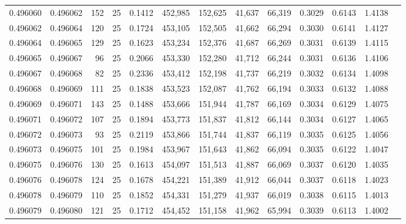 \begin{tabular}{rrrrrrrrrrrrr}
0.496060 & 0.496062 &   152 &  25 &                                     0.1412 & 452,985 & 152,625 &  41,637 &  66,319 & 0.3029 & 0.6143 & 1.4138 \\
0.496062 & 0.496064 &   120 &  25 &                                     0.1724 & 453,105 & 152,505 &  41,662 &  66,294 & 0.3030 & 0.6141 & 1.4127 \\
0.496064 & 0.496065 &   129 &  25 &                                     0.1623 & 453,234 & 152,376 &  41,687 &  66,269 & 0.3031 & 0.6139 & 1.4115 \\
0.496065 & 0.496067 &    96 &  25 &                                     0.2066 & 453,330 & 152,280 &  41,712 &  66,244 & 0.3031 & 0.6136 & 1.4106 \\
0.496067 & 0.496068 &    82 &  25 &                                     0.2336 & 453,412 & 152,198 &  41,737 &  66,219 & 0.3032 & 0.6134 & 1.4098 \\
0.496068 & 0.496069 &   111 &  25 &                                     0.1838 & 453,523 & 152,087 &  41,762 &  66,194 & 0.3033 & 0.6132 & 1.4088 \\
0.496069 & 0.496071 &   143 &  25 &                                     0.1488 & 453,666 & 151,944 &  41,787 &  66,169 & 0.3034 & 0.6129 & 1.4075 \\
0.496071 & 0.496072 &   107 &  25 &                                     0.1894 & 453,773 & 151,837 &  41,812 &  66,144 & 0.3034 & 0.6127 & 1.4065 \\
0.496072 & 0.496073 &    93 &  25 &                                     0.2119 & 453,866 & 151,744 &  41,837 &  66,119 & 0.3035 & 0.6125 & 1.4056 \\
0.496073 & 0.496075 &   101 &  25 &                                     0.1984 & 453,967 & 151,643 &  41,862 &  66,094 & 0.3035 & 0.6122 & 1.4047 \\
0.496075 & 0.496076 &   130 &  25 &                                     0.1613 & 454,097 & 151,513 &  41,887 &  66,069 & 0.3037 & 0.6120 & 1.4035 \\
0.496076 & 0.496078 &   124 &  25 &                                     0.1678 & 454,221 & 151,389 &  41,912 &  66,044 & 0.3037 & 0.6118 & 1.4023 \\
0.496078 & 0.496079 &   110 &  25 &                                     0.1852 & 454,331 & 151,279 &  41,937 &  66,019 & 0.3038 & 0.6115 & 1.4013 \\
0.496079 & 0.496080 &   121 &  25 &                                     0.1712 & 454,452 & 151,158 &  41,962 &  65,994 & 0.3039 & 0.6113 & 1.4002 \\

\end{tabular}
